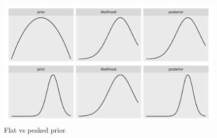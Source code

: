 \documentclass[a4, 12pt]{article}
\begin{document}
\begin{figure}[H]

{\centering \includegraphics[width=0.8\linewidth,]{../figures/flat_peaked} 

}

\caption{Flat vs peaked prior}\label{fig:flat-peaked}
\end{figure}
\end{document}
